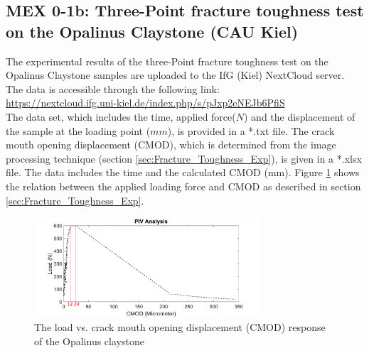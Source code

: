 \subsection{MEX 0-1b: Three-Point fracture toughness test on the Opalinus Claystone (CAU Kiel)}

The experimental results of the three-Point fracture toughness test on the Opalinus Claystone samples are uploaded to the IfG (Kiel) NextCloud server. The data is accessible through the following link:\\
\hyperlink{https://nextcloud.ifg.uni-kiel.de/index.php/s/pJxp2eNEJb6PfiS}{https://nextcloud.ifg.uni-kiel.de/index.php/s/pJxp2eNEJb6PfiS}\\

The data set, which includes the time, applied force($N$) and the displacement of the sample at the loading point ($mm$), is provided in a *.txt file. The crack mouth opening displacement (CMOD), which is determined from the image processing technique (section \ref {sec:Fracture_Toughness_Exp}), is given in a *.xlsx file. The data includes the time and the calculated CMOD (mm). Figure \ref{fig:Amir_Fracture_Toughness_Result_20_Data} shows the relation between the applied loading force and CMOD as described in section \ref {sec:Fracture_Toughness_Exp}.

\begin{figure}[!ht]
\centering
\includegraphics[width=0.75\textwidth]{figures/Amir_Fracture_Toughness_Result_20_Data.png}
\caption{The load vs. crack mouth opening displacement (CMOD) response of the Opalinus claystone}
\label{fig:Amir_Fracture_Toughness_Result_20_Data}
\end{figure}

